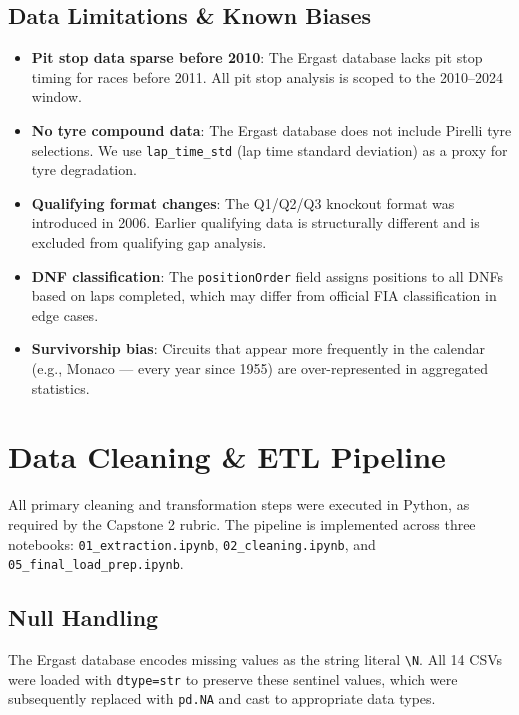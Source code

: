 \documentclass[12pt, a4paper]{article}
\begin{document}
\subsection{Data Limitations \& Known Biases}
\begin{itemize}[noitemsep]
    \item \textbf{Pit stop data sparse before 2010}: The Ergast database lacks pit stop timing for races before 2011. All pit stop analysis is scoped to the 2010--2024 window.
    \item \textbf{No tyre compound data}: The Ergast database does not include Pirelli tyre selections. We use \texttt{lap\_time\_std} (lap time standard deviation) as a proxy for tyre degradation.
    \item \textbf{Qualifying format changes}: The Q1/Q2/Q3 knockout format was introduced in 2006. Earlier qualifying data is structurally different and is excluded from qualifying gap analysis.
    \item \textbf{DNF classification}: The \texttt{positionOrder} field assigns positions to all DNFs based on laps completed, which may differ from official FIA classification in edge cases.
    \item \textbf{Survivorship bias}: Circuits that appear more frequently in the calendar (e.g., Monaco --- every year since 1955) are over-represented in aggregated statistics.
\end{itemize}

\newpage

\section{Data Cleaning \& ETL Pipeline}

All primary cleaning and transformation steps were executed in Python, as required by the Capstone 2 rubric. The pipeline is implemented across three notebooks: \texttt{01\_extraction.ipynb}, \texttt{02\_cleaning.ipynb}, and \texttt{05\_final\_load\_prep.ipynb}.

\subsection{Null Handling}
The Ergast database encodes missing values as the string literal \texttt{\textbackslash N}. All 14 CSVs were loaded with \texttt{dtype=str} to preserve these sentinel values, which were subsequently replaced with \texttt{pd.NA} and cast to appropriate data types.
\end{document}
